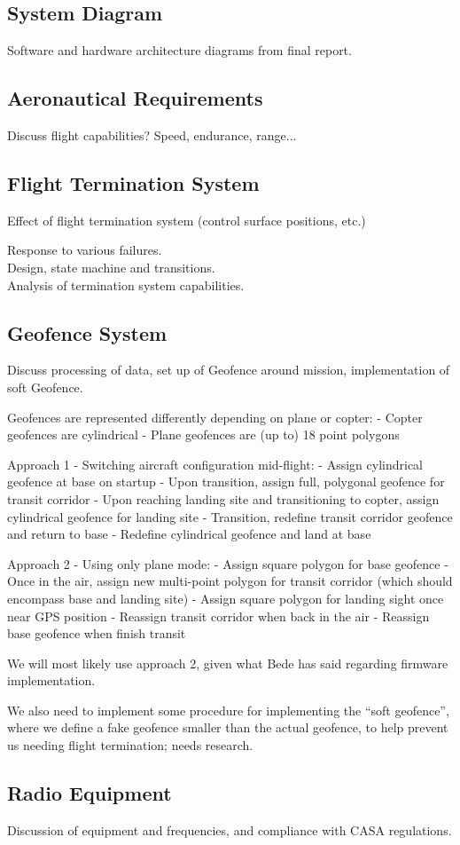 \subsection{System Diagram}
Software and hardware architecture diagrams from final report.

\subsection{Aeronautical Requirements}
Discuss flight capabilities? Speed, endurance, range...

\subsection{Flight Termination System}
Effect of flight termination system (control surface positions, etc.)

Response to various failures.\\

Design, state machine and transitions.\\

Analysis of termination system capabilities.

\subsection{Geofence System}
Discuss processing of data, set up of Geofence around mission, implementation of soft Geofence.

Geofences are represented differently depending on plane or copter:
- Copter geofences are cylindrical
- Plane geofences are (up to) 18 point polygons

Approach 1 - Switching aircraft configuration mid-flight:
- Assign cylindrical geofence at base on startup
- Upon transition, assign full, polygonal geofence for transit corridor
- Upon reaching landing site and transitioning to copter, assign cylindrical geofence for landing site
- Transition, redefine transit corridor geofence and return to base
- Redefine cylindrical geofence and land at base

Approach 2 - Using only plane mode:
- Assign square polygon for base geofence
- Once in the air, assign new multi-point polygon for transit corridor (which should encompass base and landing site)
- Assign square polygon for landing sight once near GPS position
- Reassign transit corridor when back in the air
- Reassign base geofence when finish transit

We will most likely use approach 2, given what Bede has said regarding firmware implementation.

We also need to implement some procedure for implementing the ``soft geofence'', where we define a fake geofence smaller than the actual geofence, to help prevent us needing flight termination; needs research.

\subsection{Radio Equipment}
Discussion of equipment and frequencies, and compliance with CASA regulations.